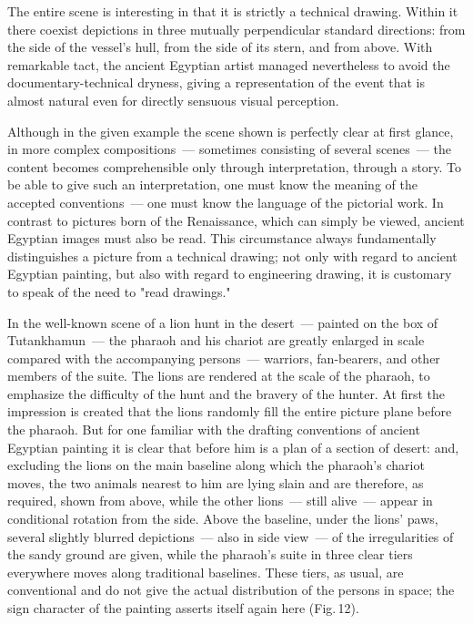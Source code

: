 
The entire scene is interesting in that it is strictly a technical drawing. Within it there
coexist depictions in three mutually perpendicular standard directions: from the side of
the vessel's hull, from the side of its stern, and from above. With remarkable tact, the
ancient Egyptian artist managed nevertheless to avoid the documentary-technical
dryness, giving a representation of the event that is almost natural even for directly
sensuous visual perception.

Although in the given example the scene shown is perfectly clear at first glance, in more
complex compositions~--- sometimes consisting of several scenes~--- the content becomes
comprehensible only through interpretation, through a story. To be able to give such an
interpretation, one must know the meaning of the accepted conventions~--- one must know
the language of the pictorial work. In contrast to pictures born of the Renaissance,
which can simply be viewed, ancient Egyptian images must also be read. This
circumstance always fundamentally distinguishes a picture from a technical drawing;
not only with regard to ancient Egyptian painting, but also with regard to engineering
drawing, it is customary to speak of the need to "read drawings."

In the well-known scene of a lion hunt in the desert~--- painted on the box of
Tutankhamun~--- the pharaoh and his chariot are greatly enlarged in scale compared with
the accompanying persons~--- warriors, fan-bearers, and other members of the suite.
The lions are rendered at the scale of the pharaoh, to emphasize the difficulty of the
hunt and the bravery of the hunter. At first the impression is created that the lions
randomly fill the entire picture plane before the pharaoh. But for one familiar with the
drafting conventions of ancient Egyptian painting it is clear that before him is a plan
of a section of desert: and, excluding the lions on the main baseline along which the
pharaoh's chariot moves, the two animals nearest to him are lying slain and are
therefore, as required, shown from above, while the other lions~--- still alive~--- appear
in conditional rotation from the side. Above the baseline, under the lions' paws, several
slightly blurred depictions~--- also in side view~--- of the irregularities of the sandy
ground are given, while the pharaoh's suite in three clear tiers everywhere moves along
traditional baselines. These tiers, as usual, are conventional and do not give the actual
distribution of the persons in space; the sign character of the painting asserts itself
again here (Fig.\,12).

